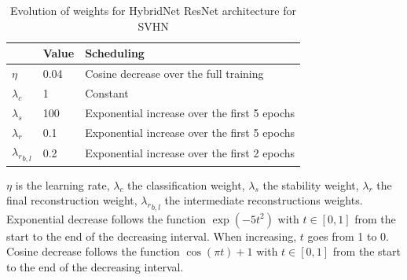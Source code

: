 \begin{table}[htbp]
\centering
\caption{Evolution of weights for HybridNet ResNet architecture for SVHN}
\label{hybridnetA:table:resnetschedsvhn}
\begin{threeparttable}
\setlength{\tabcolsep}{4pt}
\begin{tabular}{ l l l}
\toprule
    & Value & Scheduling \\
\midrule
$\eta$ & 0.04 & Cosine decrease over the full training \\
$\lambda_c$ & 1 & Constant \\
$\lambda_s$ & 100 & Exponential increase over the first 5 epochs \\
$\lambda_r$ & 0.1 & Exponential increase over the first 5 epochs \\
${\lambda_r}_{b,l}$ & 0.2 & Exponential increase over the first 2 epochs \\
\bottomrule
\end{tabular}
\begin{tablenotes}
$\eta$ is the learning rate, $\lambda_c$ the classification weight, $\lambda_s$ the stability weight, $\lambda_r$ the final reconstruction weight, ${\lambda_r}_{b,l}$ the intermediate reconstructions weights.\\
Exponential decrease follows the function $\exp(-5t^2)$ with $t\in[0,1]$ from the start to the end of the decreasing interval. When increasing, $t$ goes from 1 to 0.\\
Cosine decrease follows the function $\cos(\pi t)+1$ with $t\in[0,1]$ from the start to the end of the decreasing interval.
\end{tablenotes}
\end{threeparttable}
\end{table}





